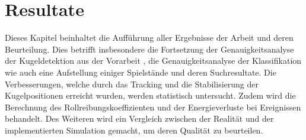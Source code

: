 \chapter{Resultate}\label{kap:resultate}
Dieses Kapitel beinhaltet die Aufführung aller Ergebnisse der Arbeit und deren Beurteilung.
Dies betrifft insbesondere die Fortsetzung der Genauigkeitsanalyse der Kugeldetektion aus der Vorarbeit \cite{project2:resultate},
die Genauigkeitsanalyse der Klassifikation wie auch eine Aufstellung einiger Spielstände und deren Suchresultate.
Die Verbesserungen, welche durch das Tracking und die Stabilisierung der Kugelpositionen erreicht wurden, werden statistisch untersucht.
Zudem wird die Berechnung des Rollreibungskoeffizienten und der Energieverluste bei Ereignissen behandelt.
Des Weiteren wird ein Vergleich zwischen der Realität und der implementierten Simulation gemacht, um deren Qualität zu beurteilen.





\clearpage

\newpage


